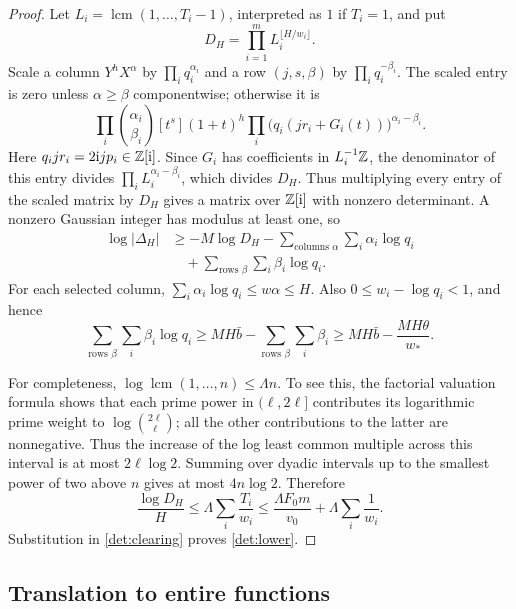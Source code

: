 \begin{proof}
Let $L_i=\operatorname{lcm}(1,\ldots,T_i-1)$, interpreted as $1$ if
$T_i=1$, and put
\[
 D_H=\prod_{i=1}^m L_i^{\lfloor H/w_i\rfloor}.
\]
Scale a column $Y^hX^\alpha$ by $\prod_iq_i^{\alpha_i}$ and a row
$(j,s,\beta)$ by $\prod_iq_i^{-\beta_i}$.  The scaled entry is zero
unless $\alpha\ge\beta$ componentwise; otherwise it is
\[
 \prod_i\binom{\alpha_i}{\beta_i}
 [t^s](1+t)^h
 \prod_i\bigl(q_i(jr_i+G_i(t))\bigr)^{\alpha_i-\beta_i}.
\]
Here $q_ijr_i=2\mathrm i jp_i\in\mathbb Z[\mathrm i]$.  Since $G_i$ has coefficients in
$L_i^{-1}\mathbb Z$, the denominator of this entry divides
$\prod_iL_i^{\alpha_i-\beta_i}$, which divides $D_H$.  Thus multiplying
every entry of the scaled matrix by $D_H$ gives a matrix over
$\mathbb Z[\mathrm i]$ with nonzero determinant.  A nonzero Gaussian integer has
modulus at least one, so
\begin{equation}
 \begin{aligned}
 \log|\Delta_H|
 &\ge -M\log D_H
      -\sum_{\text{columns }\alpha}\sum_i\alpha_i\log q_i\\
 &\quad+\sum_{\text{rows }\beta}\sum_i\beta_i\log q_i.
 \end{aligned}
 \label{det:clearing}
\end{equation}
For each selected column, $\sum_i\alpha_i\log q_i\le w\alpha\le H$.
Also $0\le w_i-\log q_i<1$, and hence
\[
 \sum_{\text{rows }\beta}\sum_i\beta_i\log q_i
 \ge MH\bar b-\sum_{\text{rows }\beta}\sum_i\beta_i
 \ge MH\bar b-\frac{MH\theta}{w_*}.
\]

For completeness, $\log\operatorname{lcm}(1,\ldots,n)\le\Lambda n$.
To see this, the factorial valuation formula shows that each prime
power in $(\ell,2\ell]$ contributes its logarithmic prime weight to
$\log\binom{2\ell}{\ell}$; all the other contributions to the latter
are nonnegative.  Thus the increase of the log least common multiple
across this interval is at most $2\ell\log2$.  Summing over dyadic
intervals up to the smallest power of two above $n$ gives at most
$4n\log2$.  Therefore
\[
 \frac{\log D_H}{H}
 \le\Lambda\sum_i\frac{T_i}{w_i}
 \le\frac{\Lambda F_0m}{v_0}+\Lambda\sum_i\frac1{w_i}.
\]
Substitution in \eqref{det:clearing} proves \eqref{det:lower}.
\end{proof}

\subsection{Translation to entire functions}

